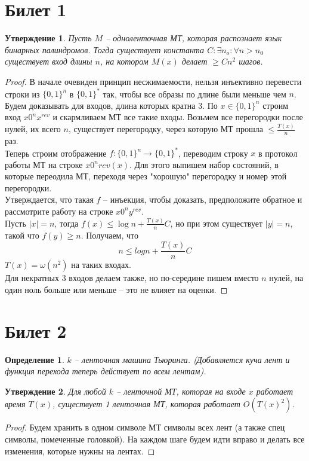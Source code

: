 \documentclass[12pt, letterpaper]{article}
\newtheorem{prop}{Утверждение}[section]
\newtheorem{defi}{Определение}[section]
\begin{document}
\section{Билет 1}
\begin{prop}
Пусть $M$ -- одноленточная МТ, которая распознает язык бинарных палиндромов. Тогда существует константа $C : \exists n_o : \forall n > n_0$ существует вход длины $n$, на котором $M(x)$ делает $\geq Cn^2$ шагов.
\end{prop}

\begin{proof}
В начале очевиден принцип несжимаемости, нельзя инъективно перевести строки из $\{0, 1 \}^n$ в $\{0, 1\}^*$ так, чтобы все образы по длине были меньше чем $n$.\\
Будем доказывать для входов, длина которых кратна 3. По $x \in \{0, 1\}^n$ строим вход $x 0^n x^{rev}$ и скармливаем МТ все такие входы. Возьмем все перегородки после нулей, их всего $n$, существует перегородку, через которую МТ прошла $\leq \frac{T(x)}{n}$ раз. \\
Теперь строим отображение $f : \{0, 1\}^n \rightarrow \{0, 1\}^{*}$, переводим строку $x$ в протокол работы МТ на строке $x 0^n rev(x)$. Для этого выпишем набор состояний, в которые переодила МТ, переходя через "хорошую" перегородку и номер этой перегородки. \\
Утверждается, что такая $f$ -- инъекция, чтобы доказать, предположите обратное и рассмотрите работу на строке $x0^n y^{rev}$.\\
Пусть $|x|=n$, тогда $f(x) \leq \log n + \frac{T(x)}{n} C$, но при этом существует $|y|=n$, такой что $f(y) \geq n$. Получаем, что 
$$n \leq log n + \frac{T(x)}{n} C $$
$T(x) = \omega(n^2) $ на таких входах. \\
Для некратных 3 входов делаем также, но по-середине пишем вместо $n$ нулей, на один ноль больше или меньше -- это не влияет на оценки.
\end{proof}

\section{Билет 2}
\begin{defi}
$k$ -- ленточная машина Тьюринга. (Добавляется куча лент и функция перехода теперь действует по всем лентам).
\end{defi}

\begin{prop}
Для любой $k$ -- ленточной МТ, которая на входе $x$ работает время $T(x)$, существует 1 ленточная МТ, которая работает $O(T(x)^2)$.
\end{prop}
\begin{proof}
Будем хранить в одном символе МТ символы всех лент (а также спец символы, помеченные головкой). На каждом шаге будем идти вправо и делать все изменения, которые нужны на лентах. 
\end{proof}
\end{document}

